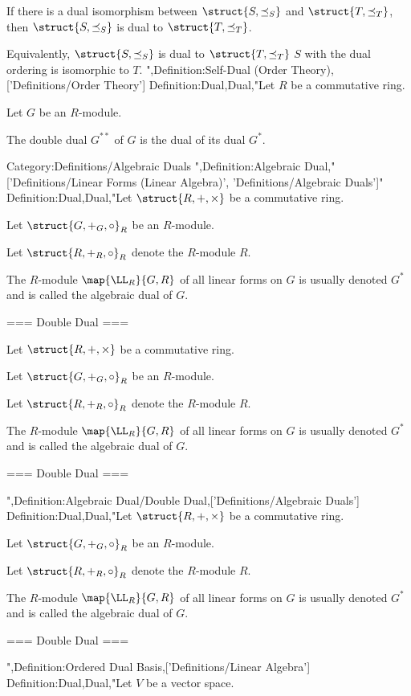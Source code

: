 If there is a dual isomorphism between $\struct {S, \preceq_S}$ and $\struct {T, \preceq_T}$, then $\struct {S, \preceq_S}$ is dual to $\struct {T, \preceq_T}$.

Equivalently, $\struct {S, \preceq_S}$ is dual to $\struct {T, \preceq_T}$  $S$ with the dual ordering is isomorphic to $T$.
",Definition:Self-Dual (Order Theory),['Definitions/Order Theory']
Definition:Dual,Dual,"Let $R$ be a commutative ring.

Let $G$ be an $R$-module.


The double dual $G^{**}$ of $G$ is the dual of its dual $G^*$.


Category:Definitions/Algebraic Duals
",Definition:Algebraic Dual,"['Definitions/Linear Forms (Linear Algebra)', 'Definitions/Algebraic Duals']"
Definition:Dual,Dual,"Let $\struct {R, +, \times}$ be a commutative ring.

Let $\struct {G, +_G, \circ}_R$ be an $R$-module.

Let $\struct {R, +_R, \circ}_R$ denote the $R$-module $R$.


The $R$-module $\map {\LL_R} {G, R}$ of all linear forms on $G$ is usually denoted $G^*$ and is called the algebraic dual of $G$.


=== Double Dual ===

Let $\struct {R, +, \times}$ be a commutative ring.

Let $\struct {G, +_G, \circ}_R$ be an $R$-module.

Let $\struct {R, +_R, \circ}_R$ denote the $R$-module $R$.


The $R$-module $\map {\LL_R} {G, R}$ of all linear forms on $G$ is usually denoted $G^*$ and is called the algebraic dual of $G$.


=== Double Dual ===

",Definition:Algebraic Dual/Double Dual,['Definitions/Algebraic Duals']
Definition:Dual,Dual,"Let $\struct {R, +, \times}$ be a commutative ring.

Let $\struct {G, +_G, \circ}_R$ be an $R$-module.

Let $\struct {R, +_R, \circ}_R$ denote the $R$-module $R$.


The $R$-module $\map {\LL_R} {G, R}$ of all linear forms on $G$ is usually denoted $G^*$ and is called the algebraic dual of $G$.


=== Double Dual ===

",Definition:Ordered Dual Basis,['Definitions/Linear Algebra']
Definition:Dual,Dual,"Let $V$ be a vector space.


